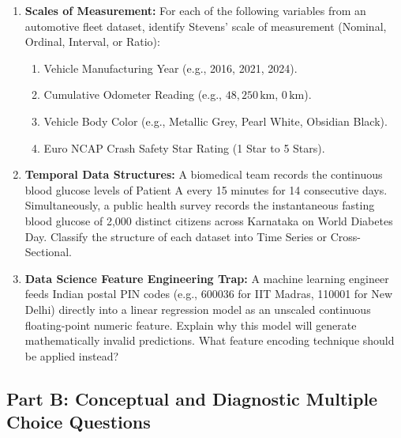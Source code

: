 \begin{enumerate}
    \item \textbf{Scales of Measurement:} For each of the following variables from an automotive fleet dataset, identify Stevens' scale of measurement (Nominal, Ordinal, Interval, or Ratio):
    \begin{enumerate}
        \item Vehicle Manufacturing Year (e.g., 2016, 2021, 2024).
        \item Cumulative Odometer Reading (e.g., $48{,}250\,\text{km}$, $0\,\text{km}$).
        \item Vehicle Body Color (e.g., Metallic Grey, Pearl White, Obsidian Black).
        \item Euro NCAP Crash Safety Star Rating (1 Star to 5 Stars).
    \end{enumerate}

    \item \textbf{Temporal Data Structures:} A biomedical team records the continuous blood glucose levels of Patient A every 15 minutes for 14 consecutive days. Simultaneously, a public health survey records the instantaneous fasting blood glucose of 2,000 distinct citizens across Karnataka on World Diabetes Day. Classify the structure of each dataset into Time Series or Cross-Sectional.

    \item \textbf{Data Science Feature Engineering Trap:} A machine learning engineer feeds Indian postal PIN codes (e.g., 600036 for IIT Madras, 110001 for New Delhi) directly into a linear regression model as an unscaled continuous floating-point numeric feature. Explain why this model will generate mathematically invalid predictions. What feature encoding technique should be applied instead?
\end{enumerate}

\subsection*{Part B: Conceptual and Diagnostic Multiple Choice Questions}

